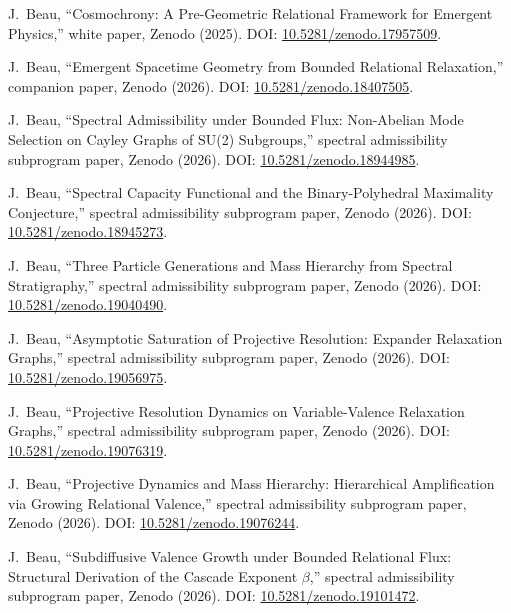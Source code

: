 J.~Beau,
``Cosmochrony: A Pre-Geometric Relational Framework for Emergent Physics,''
white paper, Zenodo (2025).
DOI: \href{https://doi.org/10.5281/zenodo.17957509}{10.5281/zenodo.17957509}.

J.~Beau,
``Emergent Spacetime Geometry from Bounded Relational Relaxation,''
companion paper, Zenodo (2026).
DOI: \href{https://doi.org/10.5281/zenodo.18407505}{10.5281/zenodo.18407505}.

J.~Beau,
``Spectral Admissibility under Bounded Flux: Non-Abelian Mode Selection on Cayley Graphs of SU(2) Subgroups,''
spectral admissibility subprogram paper, Zenodo (2026).
DOI: \href{https://doi.org/10.5281/zenodo.18944985}{10.5281/zenodo.18944985}.

J.~Beau,
``Spectral Capacity Functional and the Binary-Polyhedral Maximality Conjecture,''
spectral admissibility subprogram paper, Zenodo (2026).
DOI: \href{https://doi.org/10.5281/zenodo.18945273}{10.5281/zenodo.18945273}.

J.~Beau,
``Three Particle Generations and Mass Hierarchy from Spectral Stratigraphy,''
spectral admissibility subprogram paper, Zenodo (2026).
DOI: \href{https://doi.org/10.5281/zenodo.19040490}{10.5281/zenodo.19040490}.

J.~Beau,
``Asymptotic Saturation of Projective Resolution: Expander Relaxation Graphs,''
spectral admissibility subprogram paper, Zenodo (2026).
DOI: \href{https://doi.org/10.5281/zenodo.19056975}{10.5281/zenodo.19056975}.

J.~Beau,
``Projective Resolution Dynamics on Variable-Valence Relaxation Graphs,''
spectral admissibility subprogram paper, Zenodo (2026).
DOI: \href{https://doi.org/10.5281/zenodo.19076319}{10.5281/zenodo.19076319}.

J.~Beau,
``Projective Dynamics and Mass Hierarchy: Hierarchical Amplification via Growing Relational Valence,''
spectral admissibility subprogram paper, Zenodo (2026).
DOI: \href{https://doi.org/10.5281/zenodo.19076244}{10.5281/zenodo.19076244}.

J.~Beau,
``Subdiffusive Valence Growth under Bounded Relational Flux: Structural Derivation of the Cascade Exponent $\beta$,''
spectral admissibility subprogram paper, Zenodo (2026).
DOI: \href{https://doi.org/10.5281/zenodo.19101472}{10.5281/zenodo.19101472}.

